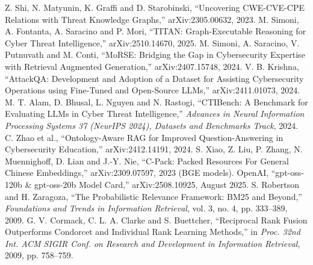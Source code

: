 \documentclass[12pt, a4paper]{article}
\newif\iffull      \fullfalse        %
\begin{document}
\begin{thebibliography}{99}
 Z. Shi, N. Matyunin, K. Graffi and D. Starobinski, ``Uncovering CWE-CVE-CPE Relations with Threat Knowledge Graphs,'' arXiv:2305.00632, 2023.
 M. Simoni, A. Fontanta, A. Saracino and P. Mori, ``TITAN: Graph-Executable Reasoning for Cyber Threat Intelligence,'' arXiv:2510.14670, 2025.
 M. Simoni, A. Saracino, V. Putnuvath and M. Conti, ``MoRSE: Bridging the Gap in Cybersecurity Expertise with Retrieval Augmented Generation,'' arXiv:2407.15748, 2024.
 V. B. Krishna, ``AttackQA: Development and Adoption of a Dataset for Assisting Cybersecurity Operations using Fine-Tuned and Open-Source LLMs,'' arXiv:2411.01073, 2024.
 M. T. Alam, D. Bhusal, L. Nguyen and N. Rastogi, ``CTIBench: A Benchmark for Evaluating LLMs in Cyber Threat Intelligence,'' \textit{Advances in Neural Information Processing Systems 37 (NeurIPS 2024), Datasets and Benchmarks Track}, 2024.
 C. Zhao et al., ``Ontology-Aware RAG for Improved Question-Answering in Cybersecurity Education,'' arXiv:2412.14191, 2024.
 S. Xiao, Z. Liu, P. Zhang, N. Muennighoff, D. Lian and J.-Y. Nie, ``C-Pack: Packed Resources For General Chinese Embeddings,'' arXiv:2309.07597, 2023 (BGE models).
 OpenAI, ``gpt-oss-120b \& gpt-oss-20b Model Card,'' arXiv:2508.10925, August 2025.
 S. Robertson and H. Zaragoza, ``The Probabilistic Relevance Framework: BM25 and Beyond,'' \textit{Foundations and Trends in Information Retrieval}, vol. 3, no. 4, pp. 333--389, 2009.
 G. V. Cormack, C. L. A. Clarke and S. Buettcher, ``Reciprocal Rank Fusion Outperforms Condorcet and Individual Rank Learning Methods,'' in \textit{Proc. 32nd Int. ACM SIGIR Conf. on Research and Development in Information Retrieval}, 2009, pp. 758--759.
\iffull
\bibitem{kipf2017} T. N. Kipf and M. Welling, ``Semi-Supervised Classification with Graph Convolutional Networks,'' \textit{International Conference on Learning Representations (ICLR)}, 2017, arXiv:1609.02907.
\bibitem{hamilton2017} W. L. Hamilton, R. Ying and J. Leskovec, ``Inductive Representation Learning on Large Graphs,'' \textit{Advances in Neural Information Processing Systems 30 (NIPS 2017)}, 2017, arXiv:1706.02216.
\bibitem{schlichtkrull2018} M. Schlichtkrull, T. N. Kipf, P. Bloem, R. van den Berg, I. Titov and M. Welling, ``Modeling Relational Data with Graph Convolutional Networks,'' in \textit{The Semantic Web (ESWC 2018)}, LNCS 10843, Springer, 2018, pp. 593--607.
\fi
\end{thebibliography}
\end{document}
